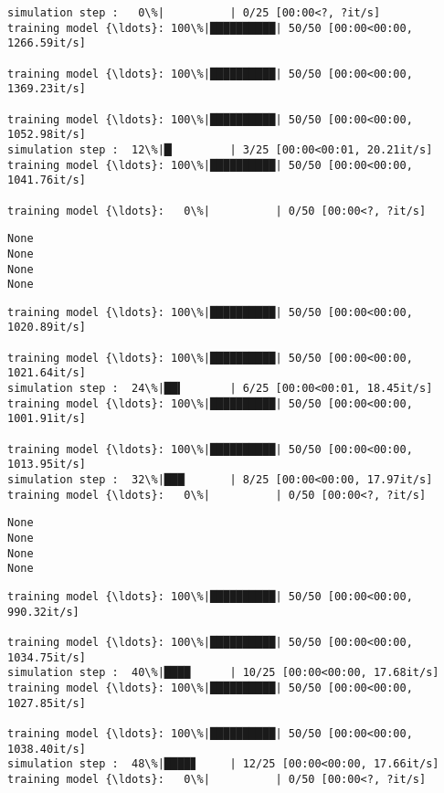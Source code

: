 \documentclass[11pt]{article}
\begin{document}
    \begin{Verbatim}[commandchars=\\\{\}]
simulation step :   0\%|          | 0/25 [00:00<?, ?it/s]
training model {\ldots}: 100\%|██████████| 50/50 [00:00<00:00, 1266.59it/s]

training model {\ldots}: 100\%|██████████| 50/50 [00:00<00:00, 1369.23it/s]

training model {\ldots}: 100\%|██████████| 50/50 [00:00<00:00, 1052.98it/s]
simulation step :  12\%|█▏        | 3/25 [00:00<00:01, 20.21it/s]
training model {\ldots}: 100\%|██████████| 50/50 [00:00<00:00, 1041.76it/s]

training model {\ldots}:   0\%|          | 0/50 [00:00<?, ?it/s]
    \end{Verbatim}

    \begin{Verbatim}[commandchars=\\\{\}]
None
None
None
None
    \end{Verbatim}

    \begin{Verbatim}[commandchars=\\\{\}]
training model {\ldots}: 100\%|██████████| 50/50 [00:00<00:00, 1020.89it/s]

training model {\ldots}: 100\%|██████████| 50/50 [00:00<00:00, 1021.64it/s]
simulation step :  24\%|██▍       | 6/25 [00:00<00:01, 18.45it/s]
training model {\ldots}: 100\%|██████████| 50/50 [00:00<00:00, 1001.91it/s]

training model {\ldots}: 100\%|██████████| 50/50 [00:00<00:00, 1013.95it/s]
simulation step :  32\%|███▏      | 8/25 [00:00<00:00, 17.97it/s]
training model {\ldots}:   0\%|          | 0/50 [00:00<?, ?it/s]
    \end{Verbatim}

    \begin{Verbatim}[commandchars=\\\{\}]
None
None
None
None
    \end{Verbatim}

    \begin{Verbatim}[commandchars=\\\{\}]
training model {\ldots}: 100\%|██████████| 50/50 [00:00<00:00, 990.32it/s]

training model {\ldots}: 100\%|██████████| 50/50 [00:00<00:00, 1034.75it/s]
simulation step :  40\%|████      | 10/25 [00:00<00:00, 17.68it/s]
training model {\ldots}: 100\%|██████████| 50/50 [00:00<00:00, 1027.85it/s]

training model {\ldots}: 100\%|██████████| 50/50 [00:00<00:00, 1038.40it/s]
simulation step :  48\%|████▊     | 12/25 [00:00<00:00, 17.66it/s]
training model {\ldots}:   0\%|          | 0/50 [00:00<?, ?it/s]
    \end{Verbatim}
\end{document}
